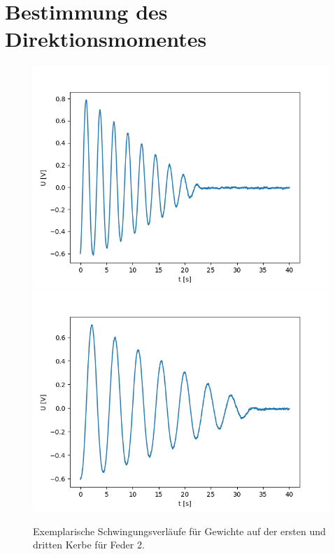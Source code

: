 \documentclass[12pt,a4paper]{article}
\begin{document}
\section{Bestimmung des Direktionsmomentes}

\begin{figure}
\begin{center}
\includegraphics[scale=0.5]{Bilder/Feder2Kerbe1}
\includegraphics[scale=0.5]{Bilder/Feder2Kerbe3}
\end{center}
\caption{Exemplarische Schwingungsverläufe für Gewichte auf der ersten und dritten Kerbe für Feder 2.}
\label{fig:RohdatenFeder2}
\end{figure}
\end{document}
